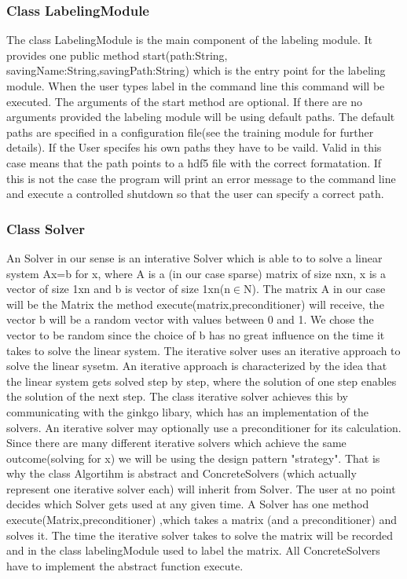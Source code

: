 \documentclass[parskip=full]{scrartcl}
\begin{document}
\subsubsection{Class LabelingModule}
The class LabelingModule is the main component of the labeling module. It provides one public method start(path:String, savingName:String,savingPath:String) which is the entry point for the labeling module. When the user types label in the command line this command will be executed. The arguments of the start method are optional. If there are no arguments provided the labeling module will be using default paths. The default paths are specified in a configuration file(see the training module for further details). If the User specifes his own paths they have to be vaild. Valid in this case means that the path points to a hdf5 file with the correct formatation. If this is not the case the program will print an error message to the command line and execute a controlled shutdown so that the user can specify a correct path. 
\subsubsection{Class Solver}
An Solver in our sense is an interative Solver which is able to to solve a linear system Ax=b for x, where A is a (in our case sparse) matrix of size nxn, x is a vector of size 1xn and b is vector of size 1xn(n$\in$N). The matrix A in our case will be the Matrix the method execute(matrix,preconditioner) will receive, the vector b will be a random vector with values between 0 and 1. We chose the vector to be random since the choice of b has no great influence on the time it takes to solve the linear system.
The \gls{iterative solver} uses an iterative approach to solve the linear sysetm. An iterative approach is characterized by the idea that the linear system gets solved step by step, where the solution of one step enables the solution of the next step. The class \gls{iterative solver} achieves this by communicating with the ginkgo libary, which has an implementation of the solvers. An \gls{iterative solver} may optionally use a \gls{preconditioner} for its calculation. Since there are many different \gls{iterative solver}s which achieve the same outcome(solving for x) we will be using the design pattern "\gls{strategy}". That is why the class Algortihm is abstract and ConcreteSolvers (which actually represent one \gls{iterative solver} each) will inherit from Solver. The user at no point decides which Solver gets used at any given time. \newline
A Solver has one method execute(Matrix,\gls{preconditioner}) ,which takes a matrix (and a \gls{preconditioner}) and solves it. The time the \gls{iterative solver} takes to solve the matrix will be recorded and in the class labelingModule used to label the matrix. All ConcreteSolvers have to implement the abstract function execute.
\end{document}

